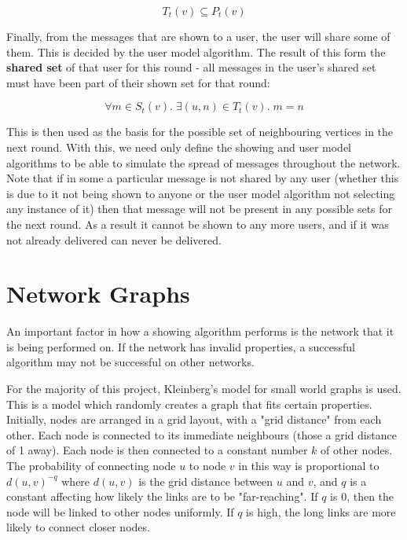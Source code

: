 \documentclass[bsc,frontabs,twoside,singlespacing,parskip,deptreport]{infthesis}     %
\begin{document}
\begin{equation}
T_{t}(v) \subseteq P_{t}(v)
\end{equation}

Finally, from the messages that are shown to a user, the user will share some of them. This is decided by the user model algorithm. The result of this form the \textbf{shared set} of that user for this round - all messages in the user's shared set must have been part of their shown set for that round:

\begin{equation}
\forall m \in S_{t}(v) .\; \exists (u, n) \in T_{t}(v) .\; m = n
\end{equation}

This is then used as the basis for the possible set of neighbouring vertices in the next round. With this, we need only define the showing and user model algorithms to be able to simulate the spread of messages throughout the network. Note that if in some a particular message is not shared by any user (whether this is due to it not being shown to anyone or the user model algorithm not selecting any instance of it) then that message will not be present in any possible sets for the next round. As a result it cannot be shown to any more users, and if it was not already delivered can never be delivered.

\section{Network Graphs} \label{sec:graph_def}
An important factor in how a showing algorithm performs is the network that it is being performed on. If the network has invalid properties, a successful algorithm may not be successful on other networks.

For the majority of this project, Kleinberg's model for small world graphs is used\cite{Kleinberg00}. This is a model which randomly creates a graph that fits certain properties. Initially, nodes are arranged in a grid layout, with a "grid distance" from each other. Each node is connected to its immediate neighbours (those a grid distance of 1 away). Each node is then connected to a constant number $k$ of other nodes. The probability of connecting node $u$ to node $v$ in this way is proportional to $d(u, v)^{-q}$ where $d(u, v)$ is the grid distance between $u$ and $v$, and $q$ is a constant affecting how likely the links are to be "far-reaching". If $q$ is 0, then the node will be linked to other nodes uniformly. If $q$ is high, the long links are more likely to connect closer nodes.
\end{document}
